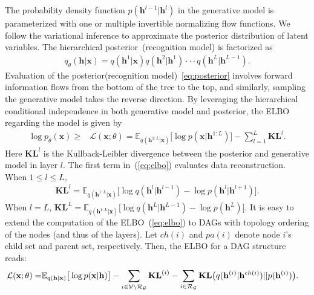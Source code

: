 \documentclass{article}
\begin{document}
The  probability  density function $p(\mathbf{h}^{l-1} | \mathbf{h}^{l})$ in the generative model is parameterized with one or multiple invertible normalizing flow functions.  We follow the variational inference  to approximate the posterior distribution of latent variables. 
The hierarchical posterior~(recognition model) is factorized as
\begin{align}\label{eq:posterior}
q_{\theta}(\mathbf{h}| \mathbf{x}) =  q(\mathbf{h}^1 | \mathbf{x})  q(\mathbf{h}^2 | \mathbf{h}^1) \cdot \cdot  \cdot  q(\mathbf{h}^{L} | \mathbf{h}^{L-1}).
\end{align}%
Evaluation of the posterior(recognition model)~\eqref{eq:posterior} involves forward information flows from the bottom of the tree to the top, and similarly, sampling  the generative model takes the reverse direction. By leveraging the hierarchical conditional independence in both  generative model and  posterior,  the ELBO regarding the model is given by %
\begin{align} \label{eq:elbo}
    \log p_{\theta}(\mathbf{x})
    \geqslant & \mathcal{L}(\mathbf{x}; \theta) 
    = \mathbb{E}_{q(\mathbf{h}^{1:L}|\mathbf{x})}\big[ \log p(\mathbf{x}|\mathbf{h}^{1:L})  \big] - \sum_{l=1}^{L} \mathbf{KL}^l.
\end{align}%
Here $\mathbf{KL}^l$ is the Kullback-Leibler divergence between the posterior and generative model in layer $l$. The first term in~(\ref{eq:elbo}) evaluates data reconstruction.  %
When $1\leqslant l \leqslant L$, 
\begin{align}\label{eq:kl}
\mathbf{KL}^l 
=\mathbb{E}_{q(\mathbf{h}^{1:L}|\mathbf{x})}\big[  \log q(\mathbf{h}^{l}|\mathbf{h}^{l-1})   - \log p(\mathbf{h}^{l}|\mathbf{h}^{l+1}) \big].
\end{align}%
When $l=L$, 
$\mathbf{KL}^L =  \mathbb{E}_{q(\mathbf{h}^{1:L}|\mathbf{x})}\big[  \log q(\mathbf{h}^{L}|\mathbf{h}^{L-1})- \log p(\mathbf{h}^{L})  \big].$ It is easy to extend the computation of the ELBO~(\ref{eq:elbo}) to DAGs with topology ordering of the nodes (and thus of the layers). 
Let $ch(i)$ and $pa(i)$ denote node $i$'s child set and parent set, respectively.
Then, the ELBO for a DAG structure reads:
\begin{align}\label{eq:elbo_dag}
\mathcal{L}(\mathbf{x}; \theta) =& \mathbb{E}_{q(\mathbf{h}|\mathbf{x})}\big[ \log p(\mathbf{x}|\mathbf{h})  \big] -  \sum_{i \in \mathcal{V}  \setminus  \mathcal{R}_{ \mathcal{G} }} \textbf{\text{KL}}^{(i)}   -    \sum_{i \in  \mathcal{R}_{ \mathcal{G} }  }  \textbf{\text{KL}}\big(q(\mathbf{h}^{(i)} | \mathbf{h}^{ch(i)} )   || p(\mathbf{h}^{(i)})  \big) .
\end{align}
\end{document}
